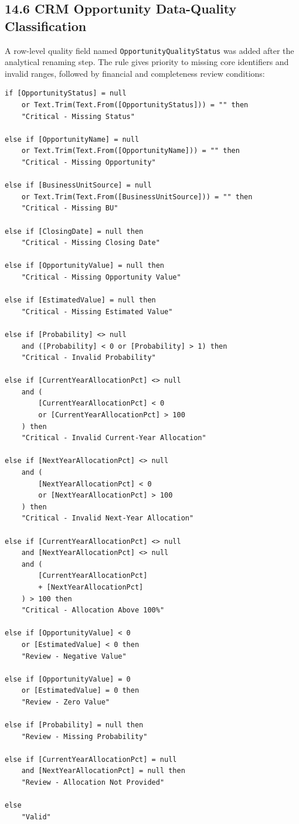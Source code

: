 \documentclass[11pt,a4paper]{article}
\begin{document}
\subsection{14.6 CRM Opportunity Data-Quality Classification}

A row-level quality field named \texttt{OpportunityQualityStatus} was added
after the analytical renaming step. The rule gives priority to missing core
identifiers and invalid ranges, followed by financial and completeness review
conditions:

\begin{lstlisting}[style=powerquery]
if [OpportunityStatus] = null
    or Text.Trim(Text.From([OpportunityStatus])) = "" then
    "Critical - Missing Status"

else if [OpportunityName] = null
    or Text.Trim(Text.From([OpportunityName])) = "" then
    "Critical - Missing Opportunity"

else if [BusinessUnitSource] = null
    or Text.Trim(Text.From([BusinessUnitSource])) = "" then
    "Critical - Missing BU"

else if [ClosingDate] = null then
    "Critical - Missing Closing Date"

else if [OpportunityValue] = null then
    "Critical - Missing Opportunity Value"

else if [EstimatedValue] = null then
    "Critical - Missing Estimated Value"

else if [Probability] <> null
    and ([Probability] < 0 or [Probability] > 1) then
    "Critical - Invalid Probability"

else if [CurrentYearAllocationPct] <> null
    and (
        [CurrentYearAllocationPct] < 0
        or [CurrentYearAllocationPct] > 100
    ) then
    "Critical - Invalid Current-Year Allocation"

else if [NextYearAllocationPct] <> null
    and (
        [NextYearAllocationPct] < 0
        or [NextYearAllocationPct] > 100
    ) then
    "Critical - Invalid Next-Year Allocation"

else if [CurrentYearAllocationPct] <> null
    and [NextYearAllocationPct] <> null
    and (
        [CurrentYearAllocationPct]
        + [NextYearAllocationPct]
    ) > 100 then
    "Critical - Allocation Above 100%"

else if [OpportunityValue] < 0
    or [EstimatedValue] < 0 then
    "Review - Negative Value"

else if [OpportunityValue] = 0
    or [EstimatedValue] = 0 then
    "Review - Zero Value"

else if [Probability] = null then
    "Review - Missing Probability"

else if [CurrentYearAllocationPct] = null
    and [NextYearAllocationPct] = null then
    "Review - Allocation Not Provided"

else
    "Valid"
\end{lstlisting}
\end{document}
